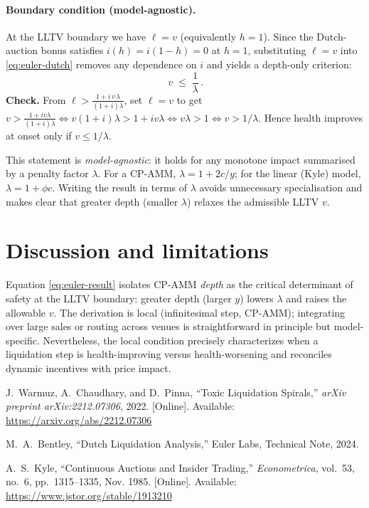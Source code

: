 \documentclass[11pt]{article}
\begin{document}
\paragraph{Boundary condition (model-agnostic).}
At the LLTV boundary we have $\ell = v$ (equivalently $h=1$). Since the Dutch-auction bonus satisfies $i(h)=i(1-h)=0$ at $h=1$, substituting $\ell=v$ into \eqref{eq:euler-dutch} removes any dependence on $i$ and yields a depth-only criterion:
\begin{equation}
\boxed{\, v \;\le\; \frac{1}{\lambda}\,}.
\label{eq:euler-result}
\end{equation}
{\color{red}
\noindent
\textbf{Check.} From $\ell > \frac{1+i\,v\,\lambda}{(1+i)\lambda}$, set $\ell=v$ to get 
$v>\frac{1+i v\lambda}{(1+i)\lambda}
\iff v(1+i)\lambda>1+i v\lambda 
\iff v\lambda>1 \iff v>1/\lambda$.
Hence health improves at onset only if $v\le 1/\lambda$.
}

\noindent
This statement is \emph{model-agnostic}: it holds for any monotone impact summarised by a penalty factor $\lambda$. For a CP-AMM, $\lambda=1+2c/y$; for the linear (Kyle) model, $\lambda=1+\phi c$. Writing the result in terms of $\lambda$ avoids unnecessary specialisation and makes clear that greater depth (smaller $\lambda$) relaxes the admissible LLTV $v$.


\section{Discussion and limitations}
Equation \eqref{eq:euler-result} isolates CP-AMM \emph{depth} as the critical determinant of safety at the LLTV boundary: greater depth (larger \(y\)) lowers \(\lambda\) and raises the allowable \(v\). The derivation is local (infinitesimal step, CP-AMM); integrating over large sales or routing across venues is straightforward in principle but model-specific. Nevertheless, the local condition precisely characterizes when a liquidation step is health-improving versus health-worsening and reconciles dynamic incentives with price impact.

\bigskip
\begin{thebibliography}{99}

J.~Warmuz, A.~Chaudhary, and D.~Pinna, 
``Toxic Liquidation Spirals,'' 
\emph{arXiv preprint arXiv:2212.07306}, 2022. [Online]. Available: \url{https://arxiv.org/abs/2212.07306}

M.~A.~Bentley, 
``Dutch Liquidation Analysis,'' 
Euler Labs, Technical Note, 2024.

A.~S.~Kyle, 
``Continuous Auctions and Insider Trading,'' 
\emph{Econometrica}, vol.~53, no.~6, pp.~1315--1335, Nov. 1985. [Online]. Available: \url{https://www.jstor.org/stable/1913210}

\end{thebibliography}
\end{document}
